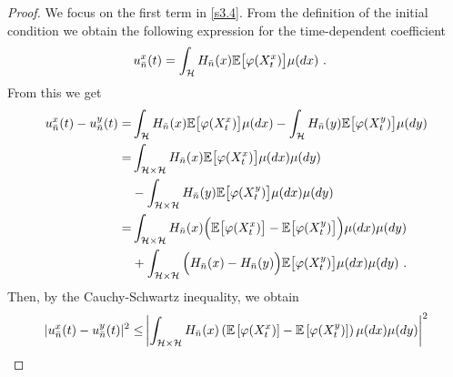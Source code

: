 \documentclass[review,onefignum,onetabnum]{siamart190516}
\begin{document}
\begin{proof}
    We focus on the first term in \eqref{s3.4}. From the definition of the
initial condition we obtain the following expression for
the time-dependent coefficient
\begin{align*}
  u_{\bar n}^x(t) &=
    \int_{\mathcal{H}} H_{\bar n}(x) \mathbb{E}\big[\varphi(X_t^x)\big] \mu(dx) \ .
\end{align*}
%
From this we get
\begin{align*}
    u_{\bar n}^x(t)-u_{\bar n}^y(t)
        =&
        \int_{\mathcal{H}} H_{\bar n}(x)
            \mathbb{E}\big[
                \varphi(X_t^x)
            \big]
            \mu(dx) -
            \int_{\mathcal{H}} H_{\bar n}(y)
            \mathbb{E}\big[
                \varphi(X_t^y)
            \big] \mu(dy)
        \\
        =&
        \int_{\mathcal{H} \times \mathcal{H}} H_{\bar n}(x)
            \mathbb{E}\big[
                \varphi(X_t^x)
            \big] \mu(dx)\mu(dy)
        \\
        &-
             \int_{\mathcal{H}\times \mathcal{H}} H_{\bar n}(y)
                \mathbb{E}\big[
                    \varphi(X_t^y)
                \big]
            \mu(dx)\mu(dy)
        \\
        =&
        \int_{\mathcal{H}\times \mathcal{H}} H_{\bar n}(x)
            \Big(
                \mathbb{E}\big[
                    \varphi(X_t^x)
                \big]
                -
                \mathbb{E}\big[
                    \varphi(X_t^y)
                \big]
            \Big)
            \mu(dx)\mu(dy)
        \\
        &+
        \int_{\mathcal{H}\times \mathcal{H}}
            \Big(
                H_{\bar n}(x) - H_{\bar n}(y)
            \Big)
            \mathbb{E}\big[
                \varphi(X_t^y)
            \big] \mu(dx) \mu(dy) \ .
\end{align*}
%
%
%
Then, by the Cauchy-Schwartz inequality, we obtain
%
%
%
\begin{equation}
    \begin{aligned}
        |u_{\bar n} ^ x(t) - u_{\bar n} ^ y(t)| ^ 2
            \le&
            \left|
                \int_{\mathcal{H} 
                \times
                \mathcal{H}} H_{\bar n}(x)
                \left(
                    \E
                     \left[
                        \varphi(X_t^x)
                     \right]
                     -
                    \E\left[
                        \varphi(X_t^y)
                    \right]
                \right) \mu(dx)\mu(dy)
            \right|^2
            \\

\end{aligned}
\end{equation}
\end{proof}
\end{document}
